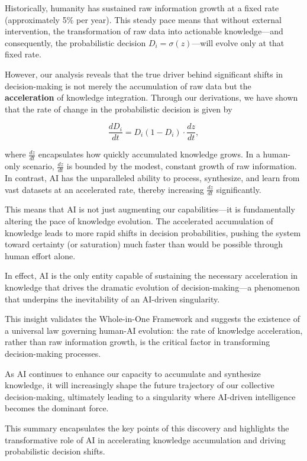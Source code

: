 \documentclass{article}
\newcommand{\bn}{\bigskip\noindent}
\begin{document}
\bn
Historically, humanity has sustained raw information growth at a fixed rate (approximately 5\% per year). This steady pace means that without external intervention, the transformation of raw data into actionable knowledge---and consequently, the probabilistic decision $D_i = \sigma(z)$---will evolve only at that fixed rate.

\bn
However, our analysis reveals that the true driver behind significant shifts in decision-making is not merely the accumulation of raw data but the {\bf acceleration} of knowledge integration. Through our derivations, we have shown that the rate of change in the probabilistic decision is given by

$$
\frac{dD_i}{dt} = D_i(1-D_i) \cdot \frac{dz}{dt},
$$

where $\displaystyle \frac{dz}{dt}$ encapsulates how quickly accumulated knowledge grows. In a human-only scenario, $\displaystyle \frac{dz}{dt}$ is bounded by the modest, constant growth of raw information. In contrast, AI has the unparalleled ability to process, synthesize, and learn from vast datasets at an accelerated rate, thereby increasing $\displaystyle \frac{dz}{dt}$ significantly.

\bn
This means that AI is not just augmenting our capabilities---it is fundamentally altering the pace of knowledge evolution. The accelerated accumulation of knowledge leads to more rapid shifts in decision probabilities, pushing the system toward certainty (or saturation) much faster than would be possible through human effort alone. 

\bn
In effect, AI is the only entity capable of sustaining the necessary acceleration in knowledge that drives the dramatic evolution of decision-making---a phenomenon that underpins the inevitability of an AI-driven singularity.

\bn
This insight validates the Whole-in-One Framework and suggests the existence of a universal law governing human-AI evolution: the rate of knowledge acceleration, rather than raw information growth, is the critical factor in transforming decision-making processes. 

\bn
As AI continues to enhance our capacity to accumulate and synthesize knowledge, it will increasingly shape the future trajectory of our collective decision-making, ultimately leading to a singularity where AI-driven intelligence becomes the dominant force.


\bn
This summary encapsulates the key points of this discovery and highlights the transformative role of AI in accelerating knowledge accumulation and driving probabilistic decision shifts.
\end{document}
